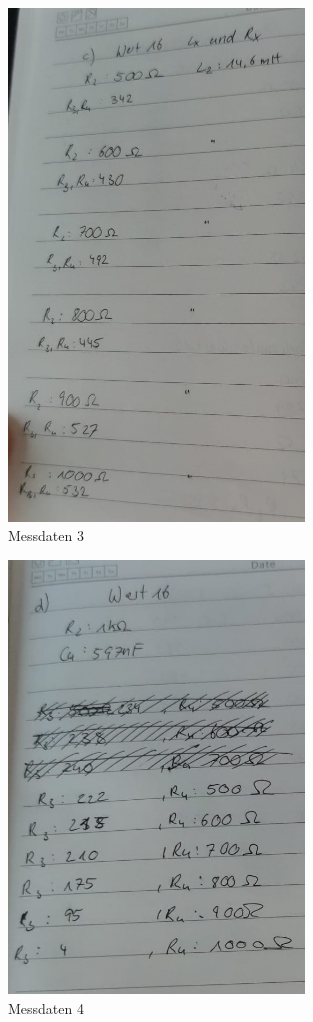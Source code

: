 \begin{figure}
  \centering
  \includegraphics[width=0.7\textwidth]{M_c).jpeg}
  \caption{Messdaten 3}
  \label{fig:M3}
\end{figure}

\begin{figure}
  \centering
  \includegraphics[width=0.7\textwidth]{M_d).jpeg}
  \caption{Messdaten 4}
  \label{fig:M4}
\end{figure}

